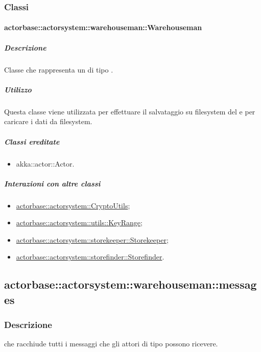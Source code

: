 \documentclass{scalatekids-article}
\begin{document}
\subsubsection{Classi}

\paragraph{actorbase::actorsystem::warehouseman::Warehouseman}
\label{sec:actorbase::actorsystem::warehouseman::Warehouseman}

\subparagraph{Descrizione}
Classe che rappresenta un  di tipo .

\subparagraph{Utilizzo}
Questa classe viene utilizzata per effettuare il salvataggio su filesystem del
 e per caricare i dati da filesystem.

\subparagraph{Classi ereditate}
\begin{itemize}
\item akka::actor::Actor.
\end{itemize}

\subparagraph{Interazioni con altre classi}
\begin{itemize}
\item \hyperref[sec:actorbase::actorsystem::utils::CryptoUtils]{actorbase::actorsystem::CryptoUtils};
\item \hyperref[sec:actorbase::actorsystem::utils::KeyRange]{actorbase::actorsystem::utils::KeyRange};
\item \hyperref[sec:actorbase::actorsystem::storekeeper::Storekeeper]{actorbase::actorsystem::storekeeper::Storekeeper};
\item \hyperref[sec:actorbase::actorsystem::storefinder::Storefinder]{actorbase::actorsystem::storefinder::Storefinder}.
\end{itemize}

\subsection{actorbase::actorsystem::warehouseman::messages}
\label{sec:actorbase::actorsystem::warehouseman::messages}

\subsubsection{Descrizione}

 che racchiude tutti i messaggi che gli attori di tipo
 possono ricevere.
\end{document}
